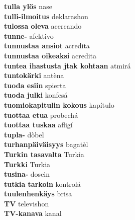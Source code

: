 \textbf{ tulla ylös  } nase \\
\textbf{ tulli-ilmoitus  } deklarashon \\
\textbf{ tulossa oleva  } acercando \\
\textbf{ tunne-  } afektivo \\
\textbf{ tunnustaa ansiot  } acredita \\
\textbf{ tunnustaa oikeaksi  } acredita \\
\textbf{ tuntea ihastusta jtak kohtaan  } atmirá \\
\textbf{ tuntokärki  } antèna \\
\textbf{ tuoda esiin  } spierta \\
\textbf{ tuoda julki  } konfesá \\
\textbf{ tuomiokapitulin kokous  } kapítulo \\
\textbf{ tuottaa etua  } probechá \\
\textbf{ tuottaa tuskaa  } afligí \\
\textbf{ tupla-  } dòbel \\
\textbf{ turhanpäiväisyys  } bagatèl \\
\textbf{ Turkin tasavalta  } Turkia \\
\textbf{ Turkki  } Turkia \\
\textbf{ tusina-  } dosein \\
\textbf{ tutkia tarkoin  } kontrolá \\
\textbf{ tuulenhenkäys  } brisa \\
\textbf{ TV  } televishon \\
\textbf{ TV-kanava  } kanal \\
